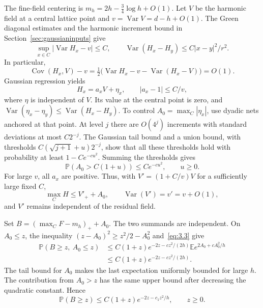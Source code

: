 \documentclass[11pt,letterpaper,reqno]{amsart}
\numberwithin{equation}{section}
\theoremstyle{remark}
\DeclareMathOperator{\Var}{Var}
\DeclareMathOperator{\Cov}{Cov}
\begin{document}
The fine-field centering is $m_h=2h-\tfrac34\log h+O(1)$. Let $V$ be the harmonic field at a central lattice point and $v=\Var V=d-h+O(1)$. The Green diagonal estimates and the harmonic increment bound in Section~\ref{sec:gaussianinputs} give
\[
\sup_{x\in C}|\Var H_x-v|\le C,
\qquad
\Var(H_x-H_y)\le C|x-y|^2/r^2.
\]
In particular,
\[
\Cov(H_x,V)-v
=\tfrac12\bigl(\Var H_x-v-\Var(H_x-V)\bigr)=O(1).
\]
Gaussian regression yields
\begin{equation}\label{eq:4.6}
H_x=a_xV+\eta_x,\qquad |a_x-1|\le C/v,
\end{equation}
where $\eta$ is independent of $V$. Its value at the central point is zero, and
$\Var(\eta_x-\eta_y)\le\Var(H_x-H_y)$.
To control $A_0=\max_C|\eta_x|$, use dyadic nets anchored at that point. At level $j$ there are $O(4^j)$ increments with standard deviations at most $C2^{-j}$. The Gaussian tail bound and a union bound, with thresholds
$C(\sqrt{j+1}+u)2^{-j}$, show that all these thresholds hold with probability at least $1-Ce^{-cu^2}$. Summing the thresholds gives
\[
\mathbb P(A_0>C(1+u))\le Ce^{-cu^2},\qquad u\ge0.
\]
For large $v$, all $a_x$ are positive. Thus, with $V'=(1+C/v)V$ for a sufficiently large fixed $C$,
\[
\max_C H\le V'_++A_0,\qquad \Var(V')=v'=v+O(1),
\]
and $V'$ remains independent of the residual field.

Set $B=(\max_CF-m_h)_++A_0$. The two summands are independent. On $A_0\le z$, the inequality
$(z-A_0)^2\ge z^2/2-A_0^2$ and~\eqref{eq:3.3} give
\[
\begin{split}
\mathbb P(B\ge z,\ A_0\le z)
&\le C(1+z)e^{-2z-cz^2/(2h)}
 \mathbb E e^{2A_0+cA_0^2/h}\\
&\le C(1+z)e^{-2z-cz^2/(2h)}.
\end{split}
\]
The tail bound for $A_0$ makes the last expectation uniformly bounded for large $h$. The contribution from $A_0>z$ has the same upper bound after decreasing the quadratic constant. Hence
\begin{equation}\label{eq:4.7}
\mathbb P(B\ge z)\le C(1+z)e^{-2z-c_1z^2/h},\qquad z\ge0.
\end{equation}
\end{document}
